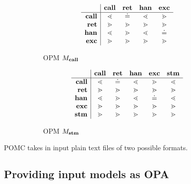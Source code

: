 \documentclass[9pt,a4paper]{article}
\begin{document}
\begin{figure}
\begin{subfigure}{.5\linewidth}
\[
\begin{array}{r | c c c c}
         & \mathbf{call}   & \mathbf{ret}   & \mathbf{han} & \mathbf{exc} \\
\hline
\mathbf{call}   & \lessdot & \doteq  & \lessdot & \gtrdot \\
\mathbf{ret}    & \gtrdot  & \gtrdot & \gtrdot  & \gtrdot \\
\mathbf{han} & \lessdot & \gtrdot & \lessdot & \doteq \\
\mathbf{exc}  & \gtrdot  & \gtrdot & \gtrdot  & \gtrdot \\
\end{array}
\]
\caption{OPM $M_{\mathbf{call}}$}
\label{fig:mcall}
\end{subfigure}
\begin{subfigure}{.5\linewidth}
\[
\begin{array}{r | c c c c c}
         & \mathbf{call}   & \mathbf{ret}   & \mathbf{han} & \mathbf{exc} & \mathbf{stm} \\
\hline
\mathbf{call}   & \lessdot & \doteq  & \lessdot & \gtrdot & \lessdot \\
\mathbf{ret}    & \gtrdot  & \gtrdot & \gtrdot  & \gtrdot & \gtrdot \\
\mathbf{han} & \lessdot & \gtrdot & \lessdot & \doteq  & \lessdot \\
\mathbf{exc}  & \gtrdot  & \gtrdot & \gtrdot  & \gtrdot & \gtrdot \\
\mathbf{stm}   & \gtrdot  & \gtrdot & \gtrdot  & \gtrdot & \gtrdot \\
\end{array}
\]
\caption{OPM $M_{\mathbf{stm}}$}
\label{fig:mstm}
\end{subfigure}
\caption{}
\label{fig:opms}
\end{figure}

POMC takes in input plain text files of two possible formats.

\subsection{Providing input models as OPA}
\end{document}
